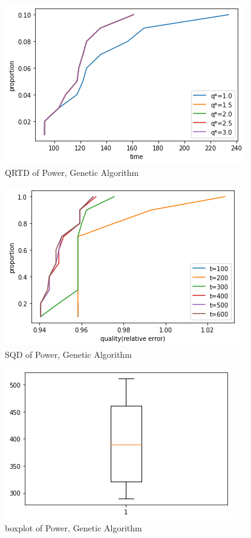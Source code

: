 \documentclass[acmlarge]{acmart}
\begin{document}
\begin{figure}[h]
	\includegraphics[width=\linewidth]{power_LS2_QRTD.png}
	\caption{QRTD of Power, Genetic Algorithm}
\end{figure}


\begin{figure}[h]
	\includegraphics[width=\linewidth]{power_LS2_SQD.png}
	\caption{SQD of Power, Genetic Algorithm}
\end{figure}

\begin{figure}[h]
	\includegraphics[width=\linewidth]{power_LS2_box.png}
	\caption{boxplot of Power, Genetic Algorithm}
\end{figure}
\end{document}
